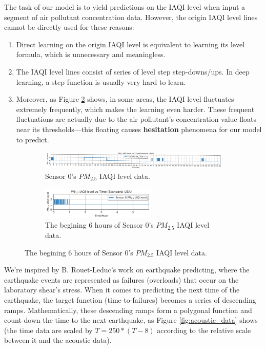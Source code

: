 The task of our model is to yield predictions on the IAQI level when input a segment of air pollutant concentration data. However, the origin IAQI level lines cannot be directly used for these reasons:
\begin{enumerate}
    \item Direct learning on the origin IAQI level is equivalent to learning its level formula, which is unnecessary and meaningless.
    \item The IAQI level lines consist of series of level step step-downs/ups. In deep learning, a step function is usually very hard to learn. 
    \item Moreover, as Figure \ref{fig:pm25_0_iaqi_level_6_hour} shows, in some areas, the IAQI level fluctuates extremely frequently, which makes the learning even harder. These frequent fluctuations are actually due to the air pollutant's concentration value floats near its thresholds—this floating causes \textbf{hesitation} phenomena for our model to predict.
\end{enumerate}

\begin{figure}[!htbp]
\centering
    \begin{subfigure}[b]{\textwidth}
        \centering
        \includegraphics[width=\textwidth]{fig/iaqi_level/pm25_0_iaqi_level_dpi1200.png}
        \caption{Sensor 0's $PM_{2.5}$ IAQI level data.}
        \label{fig:pm25_0_iaqi_level_all}
    \end{subfigure}
    \begin{subfigure}[b]{\textwidth}
        \centering
        \includegraphics[width=0.6\textwidth]{fig/iaqi_level/pm25_0_iaqi_level_6_hour.png}
        \caption{The begining 6 hours of Sensor 0's $PM_{2.5}$ IAQI level data.}
        \label{fig:pm25_0_iaqi_level_6_hour}
    \end{subfigure}
\label{fig:pm25_0_iaqi_level_all_and_6_hour}
\end{figure}

We're inspired by B. Rouet-Leduc's work \cite{rouet2017machine} on earthquake predicting, where the earthquake events are represented as failures (overloads) that occur on the laboratory shear's stress. When it comes to predicting the next time of the earthquake, the target function (time-to-failures) becomes a series of descending ramps. Mathematically, these descending ramps form a polygonal function and count down the time to the next earthquake, as Figure \ref{fig:acoustic_data} shows (the time data are scaled by $T=250*(T-8)$ according to the relative scale between it and the acoustic data).

